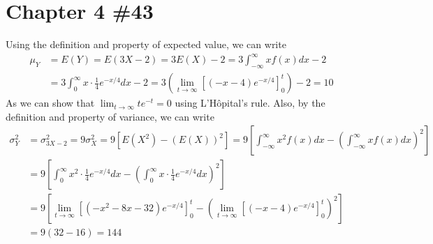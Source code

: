 \documentclass{scrartcl}
\begin{document}
\section{Chapter 4 \#43}
Using the definition and property of expected value, we can write
\begin{align*}
  \mu_Y &= E(Y) = E(3X - 2) = 3E(X) - 2 = 3\int^\infty_{-\infty} xf(x) dx - 2 \\
  &= 3 \int^\infty_0 x \cdot \frac{1}{4}e^{-x / 4} dx - 2
  = 3 \left( \lim_{t \to \infty} \left[ (-x - 4) e^{-x / 4} \right]^t_0
    \right) - 2 = 10
\end{align*}
As we can show that \(\lim_{t \to \infty} te^{-t} = 0\) using L'Hôpital's rule.
Also, by the definition and property of variance, we can write
\begin{align*}
  \sigma_Y^2
  &= \sigma_{3X - 2}^2 = 9\sigma_X^2 = 9[E(X^2) - (E(X))^2]
  = 9 \left[ \int^\infty_{-\infty} x^2 f(x) dx
    - \left( \int^\infty_{-\infty} x f(x) dx \right)^2 \right] \\
  &= 9 \left[ \int^\infty_0 x^2 \cdot \frac{1}{4} e^{-x / 4} dx
    - \left( \int^\infty_0 x \cdot \frac{1}{4} e^{-x / 4} dx \right)^2
    \right] \\
  &= 9 \left[ \lim_{t \to \infty} \left[ (-x^2 - 8x - 32) e^{-x / 4} \right]^t_0
    - \left( \lim_{t \to \infty}
    \left[ (-x - 4)e^{-x / 4} \right]^t_0 \right)^2 \right] \\
  &= 9 (32 - 16) = 144
\end{align*}
\end{document}

